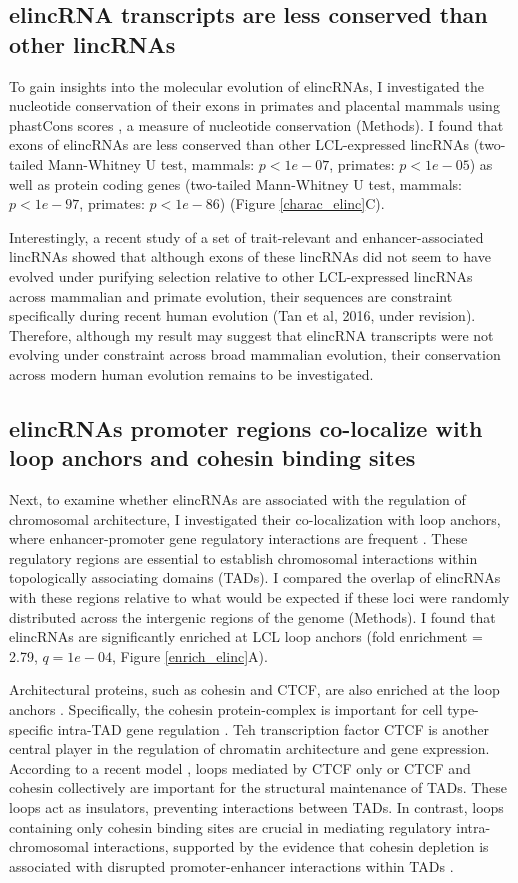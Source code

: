 \documentclass[11pt,a4paper]{report}
\begin{document}
\subsection*{elincRNA transcripts are less conserved than other lincRNAs}

To gain insights into the molecular evolution of elincRNAs, I investigated the nucleotide conservation of their exons in primates and placental mammals using phastCons scores \cite{Siepel2005}⁠, a measure of nucleotide conservation (Methods). I found that exons of elincRNAs are less conserved than other LCL-expressed lincRNAs (two-tailed Mann-Whitney U test, mammals: $p<1e-07$, primates: $p<1e-05$) as well as  protein coding genes (two-tailed Mann-Whitney U test, mammals: $p<1e-97$, primates: $p<1e-86$) (Figure \ref{charac_elinc}C). 

Interestingly, a recent study of a set of trait-relevant and enhancer-associated lincRNAs showed that although exons of these lincRNAs did not seem to have evolved under purifying selection relative to other LCL-expressed lincRNAs across mammalian and primate evolution, their sequences are constraint specifically during recent human evolution (Tan et al, 2016, under revision). Therefore, although my result may suggest that elincRNA transcripts were not evolving under constraint across broad mammalian evolution, their conservation across modern human evolution remains to be investigated.

\subsection*{elincRNAs promoter regions co-localize with loop anchors and cohesin binding sites}

Next, to examine whether elincRNAs are associated with the regulation of chromosomal architecture, I investigated their co-localization with loop anchors, where enhancer-promoter gene regulatory interactions are frequent \cite{Ji2016}. These regulatory regions are essential to establish chromosomal interactions within topologically associating domains (TADs). I compared the overlap of elincRNAs with these regions relative to what would be expected if these loci were randomly distributed across the intergenic regions of the genome (Methods). I found that elincRNAs are significantly enriched at LCL loop anchors (fold enrichment = 2.79, $q=1e-04$, Figure \ref{enrich_elinc}A).


Architectural proteins, such as cohesin and CTCF, are also enriched at the loop anchors \cite{Rao2014}⁠. Specifically, the cohesin protein-complex is important for cell type-specific intra-TAD gene regulation \cite{Hadjur2009}⁠. Teh transcription factor CTCF is another central player in the regulation of chromatin architecture and gene expression. According to a recent model \cite{Ji2016}⁠, loops mediated by CTCF only or CTCF and cohesin collectively are important for the structural maintenance of TADs. These loops act as insulators, preventing interactions between TADs. In contrast, loops containing only cohesin binding sites are crucial in mediating regulatory intra-chromosomal interactions, supported by the evidence that cohesin depletion is associated with disrupted promoter-enhancer interactions within TADs \cite{Seitan2013}⁠.
\end{document}
